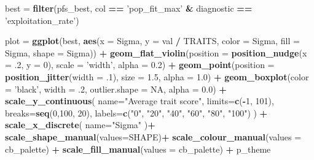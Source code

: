 \documentclass[]{book}
\newenvironment{Shaded}{\begin{snugshade}}{\end{snugshade}}
\newcommand{\DataTypeTok}[1]{\textcolor[rgb]{0.13,0.29,0.53}{#1}}
\newcommand{\DecValTok}[1]{\textcolor[rgb]{0.00,0.00,0.81}{#1}}
\newcommand{\FloatTok}[1]{\textcolor[rgb]{0.00,0.00,0.81}{#1}}
\newcommand{\KeywordTok}[1]{\textcolor[rgb]{0.13,0.29,0.53}{\textbf{#1}}}
\newcommand{\NormalTok}[1]{#1}
\newcommand{\OperatorTok}[1]{\textcolor[rgb]{0.81,0.36,0.00}{\textbf{#1}}}
\newcommand{\OtherTok}[1]{\textcolor[rgb]{0.56,0.35,0.01}{#1}}
\newcommand{\StringTok}[1]{\textcolor[rgb]{0.31,0.60,0.02}{#1}}
\begin{document}
\begin{Shaded}
\begin{Highlighting}[]
\NormalTok{best =}\StringTok{ }\KeywordTok{filter}\NormalTok{(pfs_best, col }\OperatorTok{==}\StringTok{ 'pop_fit_max'} \OperatorTok{&}\StringTok{ }\NormalTok{diagnostic }\OperatorTok{==}\StringTok{ 'exploitation_rate'}\NormalTok{)}

\NormalTok{plot =}\StringTok{ }\KeywordTok{ggplot}\NormalTok{(best, }\KeywordTok{aes}\NormalTok{(}\DataTypeTok{x =}\NormalTok{ Sigma, }\DataTypeTok{y =}\NormalTok{ val }\OperatorTok{/}\StringTok{ }\NormalTok{TRAITS, }\DataTypeTok{color =}\NormalTok{ Sigma, }\DataTypeTok{fill =}\NormalTok{ Sigma, }\DataTypeTok{shape =}\NormalTok{ Sigma)) }\OperatorTok{+}
\StringTok{  }\KeywordTok{geom_flat_violin}\NormalTok{(}\DataTypeTok{position =} \KeywordTok{position_nudge}\NormalTok{(}\DataTypeTok{x =} \FloatTok{.2}\NormalTok{, }\DataTypeTok{y =} \DecValTok{0}\NormalTok{), }\DataTypeTok{scale =} \StringTok{'width'}\NormalTok{, }\DataTypeTok{alpha =} \FloatTok{0.2}\NormalTok{) }\OperatorTok{+}
\StringTok{  }\KeywordTok{geom_point}\NormalTok{(}\DataTypeTok{position =} \KeywordTok{position_jitter}\NormalTok{(}\DataTypeTok{width =} \FloatTok{.1}\NormalTok{), }\DataTypeTok{size =} \FloatTok{1.5}\NormalTok{, }\DataTypeTok{alpha =} \FloatTok{1.0}\NormalTok{) }\OperatorTok{+}
\StringTok{  }\KeywordTok{geom_boxplot}\NormalTok{(}\DataTypeTok{color =} \StringTok{'black'}\NormalTok{, }\DataTypeTok{width =} \FloatTok{.2}\NormalTok{, }\DataTypeTok{outlier.shape =} \OtherTok{NA}\NormalTok{, }\DataTypeTok{alpha =} \FloatTok{0.0}\NormalTok{) }\OperatorTok{+}
\StringTok{  }\KeywordTok{scale_y_continuous}\NormalTok{(}
    \DataTypeTok{name=}\StringTok{"Average trait score"}\NormalTok{,}
    \DataTypeTok{limits=}\KeywordTok{c}\NormalTok{(}\OperatorTok{-}\DecValTok{1}\NormalTok{, }\DecValTok{101}\NormalTok{),}
    \DataTypeTok{breaks=}\KeywordTok{seq}\NormalTok{(}\DecValTok{0}\NormalTok{,}\DecValTok{100}\NormalTok{, }\DecValTok{20}\NormalTok{),}
    \DataTypeTok{labels=}\KeywordTok{c}\NormalTok{(}\StringTok{"0"}\NormalTok{, }\StringTok{"20"}\NormalTok{, }\StringTok{"40"}\NormalTok{, }\StringTok{"60"}\NormalTok{, }\StringTok{"80"}\NormalTok{, }\StringTok{"100"}\NormalTok{)}
\NormalTok{  ) }\OperatorTok{+}
\StringTok{  }\KeywordTok{scale_x_discrete}\NormalTok{(}
    \DataTypeTok{name=}\StringTok{"Sigma"}
\NormalTok{  )}\OperatorTok{+}
\StringTok{  }\KeywordTok{scale_shape_manual}\NormalTok{(}\DataTypeTok{values=}\NormalTok{SHAPE)}\OperatorTok{+}
\StringTok{  }\KeywordTok{scale_colour_manual}\NormalTok{(}\DataTypeTok{values =}\NormalTok{ cb_palette) }\OperatorTok{+}
\StringTok{  }\KeywordTok{scale_fill_manual}\NormalTok{(}\DataTypeTok{values =}\NormalTok{ cb_palette) }\OperatorTok{+}
\StringTok{  }\NormalTok{p_theme}


\end{Highlighting}
\end{Shaded}
\end{document}
